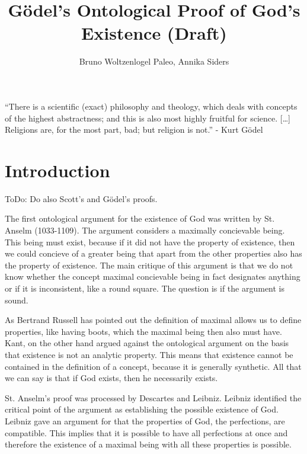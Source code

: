 \documentclass{article}
\author{Bruno Woltzenlogel Paleo, Annika Siders}
\title{G\"{o}del's Ontological Proof of God's Existence (Draft)}
\begin{document}
\maketitle

\newcommand{\ess}[2]{#1 \ \mathit{ess} \ #2}
\newcommand{\NE}{E}


\noindent
``There is a scientific (exact) philosophy and theology,
which deals with concepts of the highest abstractness; and this is also most highly fruitful for science. [\ldots] Religions are, for the most part, bad; but religion is not.'' - Kurt G\"{o}del

\section{Introduction}

ToDo: Do also Scott's and G\"{o}del's proofs.


The first ontological argument for the existence of God was written by St. Anselm (1033-1109). The argument considers a maximally concievable being. This being must exist, because if it did not have the property of existence, then we could concieve of a greater being that apart from the other properties also has the property of existence. The main critique of this argument is that we do not know whether the concept maximal concievable being in fact designates anything or if it is inconsistent, like a round square. The question is if the argument is sound. 

As Bertrand Russell has pointed out the definition of maximal allows us to define properties, like having boots, which the maximal being then also must have. Kant, on the other hand argued against the ontological argument on the basis that existence is not an analytic property. This means that existence cannot be contained in the definition of a concept, because it is generally synthetic. All that we can say is that if God exists, then he necessarily exists.

St. Anselm's proof was processed by Descartes and Leibniz. Leibniz identified the critical point of the argument as establishing the possible existence of God. Leibniz gave an argument for that the properties of God, the perfections, are compatible. This implies that it is possible to have all perfections at once and therefore the existence of a maximal being with all these properties is possible. 
\end{document}

